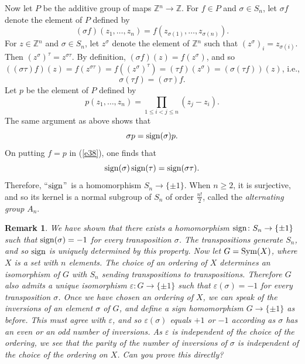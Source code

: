 \documentclass[a4paper,11pt,final]{memoir}%
\newtheorem{remark}[X]{Remark}
\theoremstyle{nonumberplain}
\begin{document}
Now let $P$ be the additive group of maps $\mathbb{Z}{}^{n}\rightarrow
\mathbb{Z}{}$. For $f\in P$ and $\sigma\in S_{n}$, let $\sigma f$ denote the
element of $P$ defined by%
\[
(\sigma f)(z_{1},\ldots,z_{n})=f(z_{\sigma(1)},\ldots,z_{\sigma(n)}).
\]
For $z\in\mathbb{Z}{}^{n}$ and $\sigma\in S_{n}$, let $z^{\sigma}$ denote the
element of $\mathbb{Z}{}^{n}$ such that $(z^{\sigma})_{i}=z_{\sigma(i)}$. Then
$(z^{\sigma})^{\tau}=z^{\sigma\tau}$. By definition, $(\sigma
f)(z)=f(z^{\sigma})$, and so $\left(  (\sigma\tau)f\right)  (z)=f(z^{\sigma
\tau})=f((z^{\sigma})^{\tau})=(\tau f)(z^{\sigma})=(\sigma(\tau f))(z)$,
i.e.,
\begin{equation}
\sigma(\tau f)=(\sigma\tau)f. \label{e38}%
\end{equation}
Let $p$ be the element of $P$ defined by%
\[
p(z_{1},\ldots,z_{n})=\prod_{1\leq i<j\leq n}(z_{j}-z_{i}).
\]
The same argument as above shows that%
\[
\sigma p=\operatorname{sign}(\sigma)p.
\]
On putting $f=p$ in (\ref{e38}), one finds that%
\[
\operatorname{sign}(\sigma)\operatorname{sign}(\tau)=\operatorname{sign}(\sigma\tau).
\]
Therefore, \textquotedblleft$\operatorname{sign}$\textquotedblright\ is a homomorphism
$S_{n}\rightarrow\{\pm1\}$. When $n\geq2$, it is surjective, and so its kernel
is a normal subgroup of $S_{n}$ of order $\frac{n!}{2}$, called the
\emph{alternating group}%
%
%
$A_{n}$.

\begin{remark}
\label{ga22a}We have shown that there exists a homomorphism $\operatorname{sign}\colon
S_{n}\rightarrow\{\pm1\}$ such that $\operatorname{sign}(\sigma)=-1$ for every transposition
$\sigma$. The transpositions generate $S_{n}$, and so $\operatorname{sign}$ is uniquely
determined by this property. Now let $G=\operatorname{Sym}(X)$, where $X$ is a set with $n$
elements. The choice of an ordering of $X$ determines an isomorphism of $G$
with $S_{n}$ sending transpositions to transpositions. Therefore $G$ also
admits a unique isomorphism $\varepsilon\colon G\rightarrow\{\pm1\}$ such that
$\varepsilon(\sigma)=-1$ for every transposition $\sigma$. Once we have chosen
an ordering of $X$, we can speak of the inversions of an element $\sigma$ of
$G$, and define a sign homomorphism $G\to\{\pm1\}$ as before. This must agree
with $\varepsilon$, and so $\varepsilon(\sigma)$ equals $+1$ or $-1$ according
as $\sigma$ has an even or an odd number of inversions. As $\varepsilon$ is
independent of the choice of the ordering, we see that the parity of the
number of inversions of $\sigma$ is independent of the choice of the ordering
on $X$. Can you prove this directly?
\end{remark}
\end{document}
